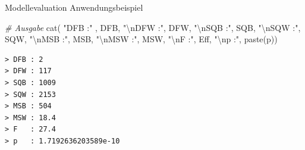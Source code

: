 \documentclass[
  8pt,
  ignorenonframetext,
]{beamer}
\newenvironment{Shaded}{\begin{snugshade}}{\end{snugshade}}
\newcommand{\CommentTok}[1]{\textcolor[rgb]{0.56,0.35,0.01}{\textit{#1}}}
\newcommand{\FunctionTok}[1]{\textcolor[rgb]{0.00,0.00,0.00}{#1}}
\newcommand{\NormalTok}[1]{#1}
\newcommand{\SpecialCharTok}[1]{\textcolor[rgb]{0.00,0.00,0.00}{#1}}
\newcommand{\StringTok}[1]{\textcolor[rgb]{0.31,0.60,0.02}{#1}}
\begin{document}
\begin{frame}[fragile]{Modellevaluation}
\protect\hypertarget{modellevaluation-21}{}
Anwendungsbeispiel

\tiny
\vspace{1mm}

\begin{Shaded}
\begin{Highlighting}[]
\CommentTok{\# Ausgabe}
\FunctionTok{cat}\NormalTok{( }\StringTok{"DFB :"}\NormalTok{ , DFB,}
    \StringTok{"}\SpecialCharTok{\textbackslash{}n}\StringTok{DFW :"}\NormalTok{, DFW,}
    \StringTok{"}\SpecialCharTok{\textbackslash{}n}\StringTok{SQB :"}\NormalTok{, SQB,}
    \StringTok{"}\SpecialCharTok{\textbackslash{}n}\StringTok{SQW :"}\NormalTok{, SQW,}
    \StringTok{"}\SpecialCharTok{\textbackslash{}n}\StringTok{MSB :"}\NormalTok{, MSB,}
    \StringTok{"}\SpecialCharTok{\textbackslash{}n}\StringTok{MSW :"}\NormalTok{, MSW,}
    \StringTok{"}\SpecialCharTok{\textbackslash{}n}\StringTok{F   :"}\NormalTok{, Eff,}
    \StringTok{"}\SpecialCharTok{\textbackslash{}n}\StringTok{p   :"}\NormalTok{, }\FunctionTok{paste}\NormalTok{(p))}
\end{Highlighting}
\end{Shaded}

\begin{verbatim}
> DFB : 2 
> DFW : 117 
> SQB : 1009 
> SQW : 2153 
> MSB : 504 
> MSW : 18.4 
> F   : 27.4 
> p   : 1.7192636203589e-10
\end{verbatim}
\end{frame}
\end{document}
